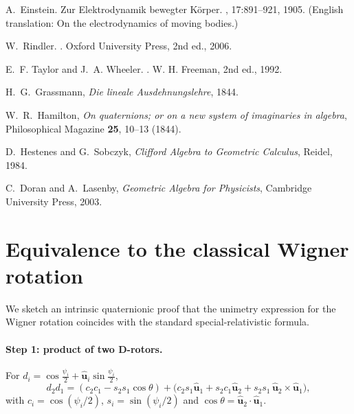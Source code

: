 \documentclass[11pt]{article}
\numberwithin{equation}{section}
\providecommand{\uhat}{\hat{\mathbf u}}
\begin{document}

\begin{thebibliography}{9}

A.~Einstein.
\newblock Zur Elektrodynamik bewegter K\"{o}rper.
, 17:891--921, 1905.
(English translation: On the electrodynamics of moving bodies.)

W.~Rindler.
.
\newblock Oxford University Press, 2nd ed., 2006.

E.~F. Taylor and J.~A. Wheeler.
.
\newblock W. H. Freeman, 2nd ed., 1992.

H.~G.~Grassmann,
\newblock \emph{Die lineale Ausdehnungslehre}, 1844.

W.~R.~Hamilton,
\newblock \emph{On quaternions; or on a new system of imaginaries in algebra}, Philosophical Magazine \textbf{25}, 10--13 (1844).

D.~Hestenes and G.~Sobczyk,
\newblock \emph{Clifford Algebra to Geometric Calculus}, Reidel, 1984.

C.~Doran and A.~Lasenby,
\newblock \emph{Geometric Algebra for Physicists}, Cambridge University Press, 2003.

\end{thebibliography}




\appendix
\section{Equivalence to the classical Wigner rotation}
\label{app:wigner-classical}

We sketch an intrinsic quaternionic proof that the unimetry expression for the Wigner rotation
coincides with the standard special-relativistic formula.

\paragraph{Step 1: product of two D-rotors.}
For $d_i=\cos\frac{\psi_i}{2}+\uhat_i\sin\frac{\psi_i}{2}$,
\begin{equation}
\label{eq:auto:45}
d_2 d_1
=(c_2c_1-s_2s_1\cos\theta)
+\Big(c_2s_1\uhat_1+s_2c_1\uhat_2+s_2s_1\,\uhat_2\times\uhat_1\Big),
\end{equation}
with $c_i=\cos(\psi_i/2)$, $s_i=\sin(\psi_i/2)$ and $\cos\theta=\uhat_2\!\cdot\!\uhat_1$.
\end{document}
